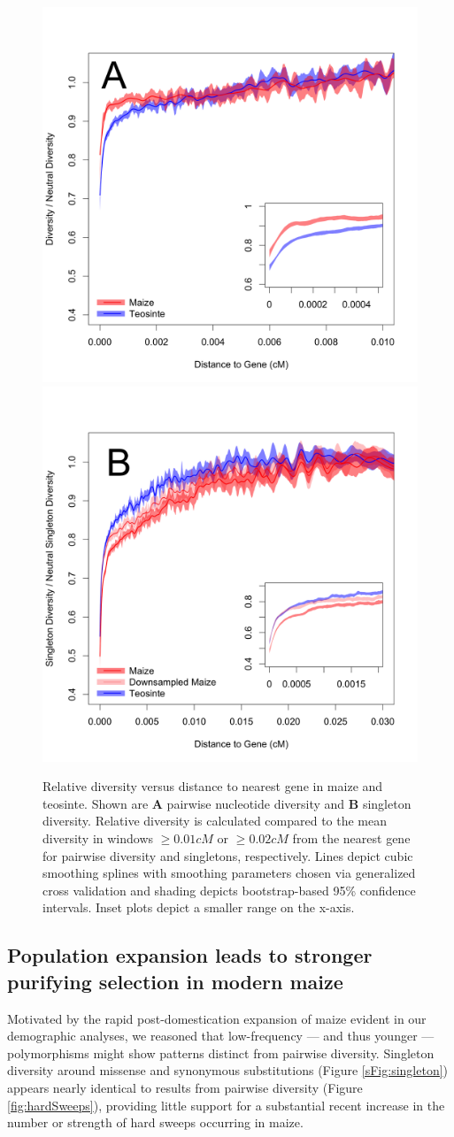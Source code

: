 \documentclass[twoside, twocolumn, letterpaper]{article}
\begin{document}
\begin{figure}[tb]
\centering
\includegraphics[width=.45\textwidth]{FigsAndFiles/distanceToGene_WithSignificance_Folded2_manuscript.png} \includegraphics[width=.45\textwidth]{FigsAndFiles/distanceToGene_WithSignificance_Singletons_Downsampled_threeLines_manuscript.png}
\caption{Relative diversity versus distance to nearest gene in maize and teosinte. 
Shown are \textbf{A} pairwise nucleotide diversity and \textbf{B} singleton diversity.  
Relative diversity is calculated compared to the mean diversity in windows $\geq 0.01 cM$ or $\geq 0.02 cM$ from the nearest
gene for pairwise diversity and singletons, respectively. 
  Lines depict cubic smoothing splines with smoothing parameters chosen via generalized cross validation and shading depicts bootstrap-based 95\% confidence intervals.
  Inset plots depict a smaller range on the x-axis. \label{fig:purify}
  }
\end{figure}

\subsection*{Population expansion leads to stronger purifying selection in modern maize} %
Motivated by the rapid post-domestication expansion of maize evident in our demographic analyses, we reasoned that low-frequency --- and thus younger --- polymorphisms might show patterns distinct from pairwise diversity. 
Singleton diversity around missense and synonymous substitutions (Figure \ref{sFig:singleton}) appears nearly identical to results from pairwise diversity (Figure \ref{fig:hardSweeps}), providing little support for a substantial recent increase in the number or strength of hard sweeps occurring in maize. 
\end{document}
